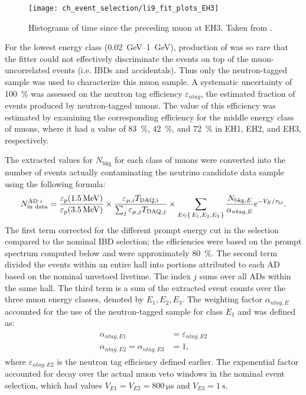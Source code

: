 \begin{figure}
    \centering
    \texttt{[image: ch\_event\_selection/li9\_fit\_plots\_EH3]}
    \caption[Time-since-muon histograms for EH3]{
        Histograms of time since the preceding muon at EH3.
        Taken from \cite{jinjing_2020may}.
    }
    \label{fig:li9_fits_EH3}
\end{figure}
For the lowest energy class (\SIrange{0.02}{1}{\GeV}),
production of \li{} was so rare that the fitter
could not effectively discriminate the \li{} events
on top of the muon-uncorrelated events (i.e. IBDs and accidentals).
Thus only the neutron-tagged sample was used to characterize this muon sample.
A systematic uncertainty of \SI{100}{\percent} was assessed
on the neutron tag efficiency $\varepsilon_{ntag}$,
the estimated fraction of \li{} events produced by neutron-tagged muons.
The value of this efficiency was estimated by examining
the corresponding efficiency for the middle energy class of muons,
where it had a value of \SI{83}{\percent}, \SI{42}{\percent}, and \SI{72}{\percent}
in EH1, EH2, and EH3, respectively.

The extracted values for $N_\text{bkg}$ for each class of muons
were converted into the number of \li{} events
actually contaminating the neutrino candidate data sample
using the following formula:
\begin{equation}\label{eq:li9_rate_conv}
    N_\text{in data}^{\text{AD }i} =
    \frac{\varepsilon_p(\SI{1.5}{\MeV})}{\varepsilon_p(\SI{3.5}{\MeV})}
    \times
    \frac{\varepsilon_{\mu,i} T_{\text{DAQ},i}}{
        \sum_j \varepsilon_{\mu,j} T_{\text{DAQ},j}
    }
    \times
    \sum_{E\in\set{E_1,E_2,E_3}}
    \frac{N_{\text{bkg},E}}{\alpha_{ntag, E}} e^{-V_E/\tau_{\text{Li}}}.
\end{equation}
The first term corrected for the different prompt energy cut
in the \li{} selection compared to the nominal IBD selection;
the efficiencies were based on the \li{} prompt spectrum computed below
and were approximately \SI{80}{\percent}.
The second term divided the events within an entire hall
into portions attributed to each AD based on the nominal unvetoed livetime.
The index $j$ sums over all ADs within the same hall.
The third term is a sum of the extracted event counts
over the three muon energy classes, denoted by $E_1,E_2,E_3$.
The weighting factor $\alpha_{ntag,E}$ accounted
for the use of the neutron-tagged sample for class $E_1$
and was defined as:
\begin{align}
    \begin{split}
        \alpha_{ntag,E1} &= \varepsilon_{ntag,E2} \\
        \alpha_{ntag,E2} = \alpha_{ntag,E3} &= 1,
    \end{split}
\end{align}
where $\varepsilon_{ntag,E2}$ is the neutron tag efficiency defined earlier.
The exponential factor accounted for \li{} decay
over the actual muon veto windows in the nominal event selection,
which had values $V_{E1} = V_{E2} = \SI{800}{\us}$
and $V_{E3} = \SI{1}{\s}$.

